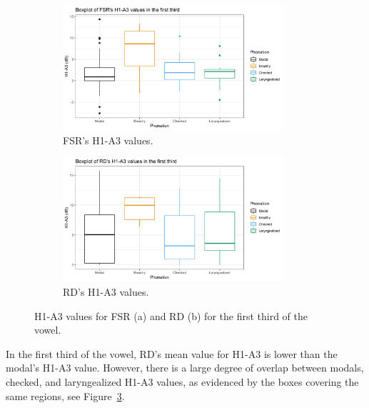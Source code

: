 \documentclass[12pt, letterpaper]{article}
\begin{document}
\begin{figure}[!h]
	\centering
	\begin{subfigure}{.5\textwidth}
		\centering
		\includegraphics[width=0.9\textwidth]{../mean_FSR_h1a3_First.png}
		\caption{FSR's H1-A3 values.}
		\label{fig:FSRh1a3first} 
	\end{subfigure}%
	\begin{subfigure}{.5\textwidth}
		\centering
		\includegraphics[width=0.9\textwidth]{../mean_RD_h1a3_First.png}
		\caption{RD's H1-A3 values.}
		\label{fig:RDh1a3first} 
	\end{subfigure}
	\caption{H1-A3 values for FSR (a) and RD (b) for the first third of the vowel. }
	\label{fig:h1a3first}
\end{figure}

In the first third of the vowel, RD's mean value for H1-A3 is lower than the modal's H1-A3 value. However, there is a large degree of overlap between modals, checked, and laryngealized H1-A3 values, as evidenced by the boxes covering the same regions, see Figure~\ref{fig:h1a3first}. 
\end{document}
